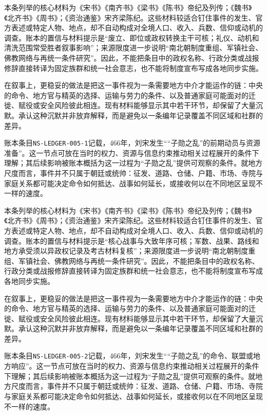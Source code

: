本条列举的核心材料为《宋书》《南齐书》《梁书》《陈书》帝纪及列传；《魏书》《北齐书》《周书》；《资治通鉴》宋齐梁陈纪。这些材料较适合钉住事件的发生、官方表述或特定人物、地点，却不自动构成对全境人口、收入、兵数、信仰或动机的调查。账本的置信与材料提示是“废立、即位或政权转换主干可核；礼仪、动机和清洗范围常受胜者叙事影响”；来源限度进一步说明“南北朝制度重组、军镇社会、佛教网络与再统一条件研究”。因此，不能把条目中的政权名称、行政分类或战报修辞直接转译为固定族群和统一社会意志，也不能将制度宣布写成各地同步实施。

在叙事上，更稳妥的做法是把这一事件视为一条需要地方中介才能运作的链：中央的命令、地方官与精英的选择、运输与劳力的条件、以及普通家庭可能面对的迁徙、赋役或安全风险彼此相连。现有材料能够显示其中若干环节，却保留了大量沉默。承认这种沉默并非放弃解释，而是避免以一条编年记录覆盖不同区域和社群的差异。

账本条目\texttt{NS-LEDGER-005-1}记载，466年，刘宋发生““子勋之乱”的前期动员与资源准备”。这一节点可放在当时的权力、资源与信息约束推动相关过程展开的条件下理解；其后续影响被账本概括为这一过程为“子勋之乱”提供可观察的条件。就地方尺度而言，事件并不只属于朝廷或统帅：征发、道路、仓储、户籍、市场、寺院与家庭关系都可能决定命令如何抵达、战事如何延长，或接收何以在不同地区呈现不一样的速度。

本条列举的核心材料为《宋书》《南齐书》《梁书》《陈书》帝纪及列传；《魏书》《北齐书》《周书》；《资治通鉴》宋齐梁陈纪。这些材料较适合钉住事件的发生、官方表述或特定人物、地点，却不自动构成对全境人口、收入、兵数、信仰或动机的调查。账本的置信与材料提示是“核心战事与大致年序可核；军数、战果、路线和地方承受须以异政权记录及考古材料复核”；来源限度进一步说明“南北朝制度重组、军镇社会、佛教网络与再统一条件研究”。因此，不能把条目中的政权名称、行政分类或战报修辞直接转译为固定族群和统一社会意志，也不能将制度宣布写成各地同步实施。

在叙事上，更稳妥的做法是把这一事件视为一条需要地方中介才能运作的链：中央的命令、地方官与精英的选择、运输与劳力的条件、以及普通家庭可能面对的迁徙、赋役或安全风险彼此相连。现有材料能够显示其中若干环节，却保留了大量沉默。承认这种沉默并非放弃解释，而是避免以一条编年记录覆盖不同区域和社群的差异。

账本条目\texttt{NS-LEDGER-005-2}记载，466年，刘宋发生““子勋之乱”的命令、联盟或地方响应”。这一节点可放在当时的权力、资源与信息约束推动相关过程展开的条件下理解；其后续影响被账本概括为这一过程为“子勋之乱”提供可观察的条件。就地方尺度而言，事件并不只属于朝廷或统帅：征发、道路、仓储、户籍、市场、寺院与家庭关系都可能决定命令如何抵达、战事如何延长，或接收何以在不同地区呈现不一样的速度。

